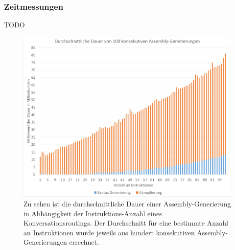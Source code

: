 \subsubsection{Zeitmessungen}
TODO

\begin{figure} %
	\centering
		\includegraphics[width=\textwidth]{img/AverageTimeDiagram.png}
	\caption[Durchschnittliche Dauer von Assembly-Generierungen]{Zu sehen ist die durchschnittliche Dauer einer Assembly-Generierung in Abhängigkeit der Instruktions-Anzahl eines Konversationsroutings. Der Durchschnitt für eine bestimmte Anzahl an Instruktionen wurde jeweils aus hundert konsekutiven Assembly-Generierungen errechnet.}
	\label{fig:TestRouting}
\end{figure}